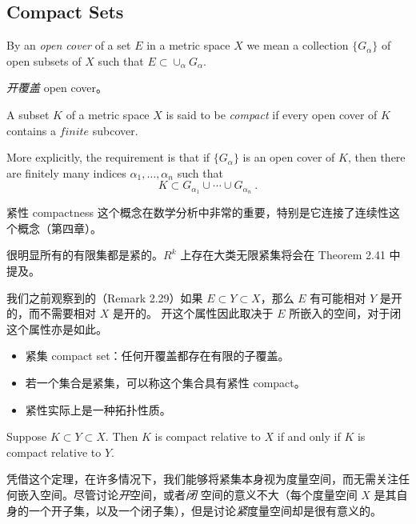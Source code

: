 \documentclass[../poma-notes.tex]{subfiles}
\begin{document}
\subsection*{Compact Sets}

\begin{definition}
  By an \textit{open cover} of a set $E$ in a metric space $X$ we mean a collection $\{G_{\alpha}\}$ of open subsets
  of $X$ such that $E \subset \cup_{\alpha} G_{\alpha}$.
\end{definition}

\anote \textit{开覆盖} open cover。

\begin{definition}
  A subset $K$ of a metric space $X$ is said to be \textit{compact} if every open cover of $K$ contains a $finite$
  subcover.

  More explicitly, the requirement is that if $\{G_{\alpha}\}$ is an open cover of $K$, then there are finitely many
  indices $\alpha_1,\dots,\alpha_n$ such that
  \[K \subset G_{\alpha_1} \cup \cdots \cup G_{\alpha_n}\ .\]
\end{definition}

紧性 compactness 这个概念在数学分析中非常的重要，特别是它连接了连续性这个概念（第四章）。

很明显所有的有限集都是紧的。$R^k$ 上存在大类无限紧集将会在 Theorem 2.41 中提及。

我们之前观察到的（Remark 2.29）如果 $E \subset Y \subset X$，那么 $E$ 有可能相对 $Y$ 是开的，而不需要相对 $X$ 是开的。
开这个属性因此取决于 $E$ 所嵌入的空间，对于闭这个属性亦是如此。

\begin{anote}
  \begin{itemize}
    \item 紧集 compact set：任何开覆盖都存在有限的子覆盖。
    \item 若一个集合是紧集，可以称这个集合具有紧性 compact。
    \item 紧性实际上是一种拓扑性质。
  \end{itemize}
\end{anote}

\begin{theorem}
  Suppose $K \subset Y \subset X$. Then $K$ is compact relative to $X$ if and only if $K$ is compact relative to $Y$.
\end{theorem}

凭借这个定理，在许多情况下，我们能够将紧集本身视为度量空间，而无需关注任何嵌入空间。尽管讨论\textit{开}空间，或者\textit{闭}
空间的意义不大（每个度量空间 $X$ 是其自身的一个开子集，以及一个闭子集），但是讨论\textit{紧}度量空间却是很有意义的。
\end{document}
